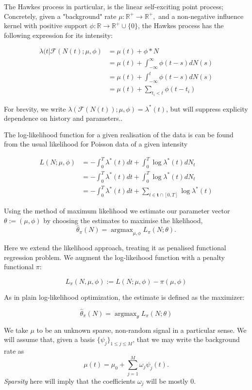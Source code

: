 \documentclass[11pt]{article}
\def\lt{<}
\begin{document}
    The Hawkes process \cite{hawkes_point_1971} in particular, is the linear
self-exciting point process; Concretely, given a "background" rate
\(\mu:\mathbb{R}^+\rightarrow\mathbb{R}^+,\) and a non-negative
influence kernel with positive support
\(\phi:\mathbb{R}\rightarrow\mathbb{R}^+\cup\{0\}\), the Hawkes process
has the following expression for its intensity:

\[
\begin{aligned}
\lambda(t|\mathcal{F}(N(t);\mu,\phi) &= \mu(t) + \phi * N\\
&= \mu(t)  + \int_{-\infty}^{\infty}\phi(t-s)dN(s)\\
&= \mu(t) + \int_{-\infty}^{t}\phi(t-s)dN(s)\\
&= \mu(t) + \sum_{t_i\lt t}\phi(t-t_i)
\end{aligned}
\]

For brevity, we write
\(\lambda(\mathcal{F}(N(t));\mu,\phi)=\lambda^*(t)\), but will suppress
explicity dependence on history and parameters..

    The log-likelihood function for a given realisation of the data is can
be found from the usual likelihood for Poisson data of a given intensity
\cite{ozaki_etimating_1979}

\[\begin{aligned}L(N;\mu,\phi) &=-\int_0^T\lambda^*(t)dt + \int_0^T\log \lambda^*(t) dN_t \\
&=-\int_0^T\lambda^*(t)dt + \int_0^T\log \lambda^*(t) dN_t \\
&=-\int_0^T\lambda^*(t)dt + \sum_{t\in\mathbf{t}\cap [0,T]}\log \lambda^*(t)
\end{aligned}\]

Using the method of maximum likelihood we estimate our parameter vector
\(\theta:=(\mu, \phi)\) by choosing the estimates to maximise the
likelihood,
\[\hat{\theta}_\pi(N) = \operatorname{argmax}_{\mu,\phi} L_\pi(N;\theta).\]

    Here we extend the likelihood approach, treating it as penalised
functional regression problem. We augment the log-likeihood function
with a penalty functional \(\pi\):

\[L_\pi(N, \mu, \phi):= L(N; \mu, \phi)- \pi(\mu, \phi)\]

As in plain log-likelihood optimization, the estimate is defined as the
maximizer:

\[\hat{\theta}_\pi(N) = \operatorname{argmax}_\theta L_\pi(N;\theta)\]

    We take \(\mu\) to be an unknown sparse, non-random signal in a
particular sense. We will assume that, given a basis
\(\{\psi_j \}_{1\leq j\leq M}\), that we may write the background rate
as \[\mu(t) = \mu_0 + \sum_{j=1}^M  \omega_j \psi_j(t).\]
\emph{Sparsity} here will imply that the coefficients \(\omega_j\) will
be mostly 0.
\end{document}
